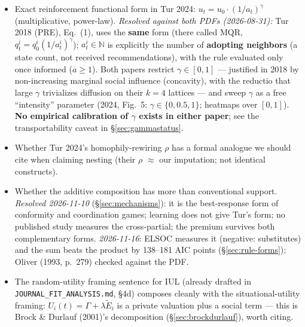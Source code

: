 \documentclass[11pt,a4paper]{article}
\newcommand{\Ee}{\tilde{E}}                 %
\newcommand{\code}[1]{\texttt{#1}}
\begin{document}
\begin{itemize}
  \item[$\boxtimes$] Exact reinforcement functional form in Tur 2024:
    $u_t = u_0 \cdot (1/a_t)^{\gamma}$ (multiplicative, power-law).
    \emph{Resolved against both PDFs (2026-08-31):} Tur 2018 (PRE), Eq.~(1), uses the
    \textbf{same} form (there called MQR, $q_t^i = q_0^i (1/a_t^i)^{\gamma}$);
    $a_t^i \in \mathbb{N}$ is explicitly the number of \textbf{adopting neighbors}
    (a state count, not received recommendations), with the rule evaluated only once
    informed ($a \ge 1$). Both papers restrict $\gamma \in [0,1]$ --- justified in 2018
    by non-increasing marginal social influence (concavity), with the reductio that
    large $\gamma$ trivializes diffusion on their $k = 4$ lattices --- and sweep
    $\gamma$ as a free ``intensity'' parameter (2024, Fig.~5: $\gamma \in \{0, 0.5,
    1\}$; heatmaps over $[0,1]$). \textbf{No empirical calibration of $\gamma$ exists in
    either paper}; see the transportability caveat in \S\ref{sec:gammastatus}.
  \item[$\square$] Whether Tur 2024's homophily-rewiring $\rho$ has a formal analogue we
    should cite when claiming nesting (their $\rho$ $\approx$ our imputation; not
    identical constructs).
  \item[$\boxtimes$] Whether the additive composition has more than conventional support.
    \emph{Resolved 2026-11-10} (\S\ref{sec:mechanisms}): it is the best-response form of
    conformity and coordination games; learning does not give Tur's form; no published study measures
    the cross-partial; the premium survives both complementary forms. \emph{2026-11-16}: ELSOC
    measures it (negative: substitutes) and the sum beats the product by 138--181 AIC points
    (\S\ref{sec:rule-forms}); Oliver (1993, p.~279) checked against the PDF.
  \item[$\square$] The random-utility framing sentence for IUL (already drafted in
    \code{JOURNAL\_FIT\_ANALYSIS.md}, \S 4d) composes cleanly with the
    situational-utility framing: $U_i(t) = \Gamma + \lambda \Ee_i$ is a private valuation
    plus a social term --- this is Brock \& Durlauf (2001)'s decomposition
    (\S\ref{sec:brockdurlauf}), worth citing.
\end{itemize}
\end{document}
